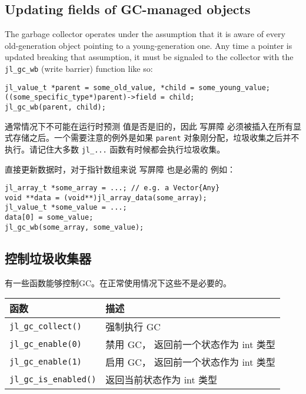 \hypertarget{16854094057405745675}{}


\subsection{Updating fields of GC-managed objects}



The garbage collector operates under the assumption that it is aware of every old-generation object pointing to a young-generation one. Any time a pointer is updated breaking that assumption, it must be signaled to the collector with the \texttt{jl\_gc\_wb} (write barrier) function like so:




\begin{lstlisting}
jl_value_t *parent = some_old_value, *child = some_young_value;
((some_specific_type*)parent)->field = child;
jl_gc_wb(parent, child);
\end{lstlisting}



通常情况下不可能在运行时预测 值是否是旧的，因此 写屏障 必须被插入在所有显式存储之后。一个需要注意的例外是如果 \texttt{parent} 对象刚分配，垃圾收集之后并不执行。请记住大多数 \texttt{jl\_...} 函数有时候都会执行垃圾收集。



直接更新数据时，对于指针数组来说 写屏障 也是必需的 例如：




\begin{lstlisting}
jl_array_t *some_array = ...; // e.g. a Vector{Any}
void **data = (void**)jl_array_data(some_array);
jl_value_t *some_value = ...;
data[0] = some_value;
jl_gc_wb(some_array, some_value);
\end{lstlisting}



\hypertarget{13611710259554554355}{}


\subsection{控制垃圾收集器}



有一些函数能够控制GC。在正常使用情况下这些不是必要的。




\begin{table}[h]

\begin{tabulary}{\linewidth}{|L|L|}
\hline
函数 & 描述 \\
\hline
\texttt{jl\_gc\_collect()} & 强制执行 GC \\
\hline
\texttt{jl\_gc\_enable(0)} & 禁用 GC， 返回前一个状态作为 int 类型 \\
\hline
\texttt{jl\_gc\_enable(1)} & 启用 GC， 返回前一个状态作为 int 类型 \\
\hline
\texttt{jl\_gc\_is\_enabled()} & 返回当前状态作为 int 类型 \\
\hline
\end{tabulary}

\end{table}



